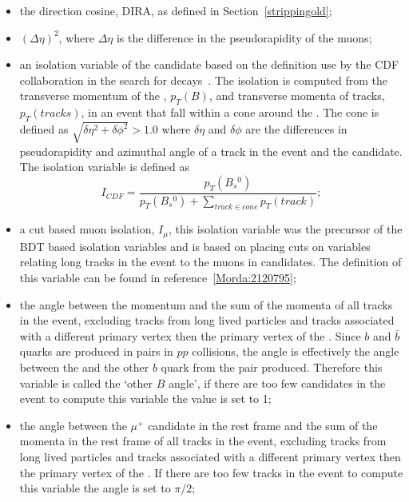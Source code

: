 \begin{itemize}
\item the direction cosine, DIRA, as defined in Section~\ref{strippingold};
\item $(\Delta \eta)^{2}$, where $\Delta \eta$ is the difference in the pseudorapidity of the muons;
\item an isolation variable of the \bs candidate based on the definition use by the CDF collaboration in the search for \bmumu decays~\cite{Abulencia:2005pw}. The isolation is computed from the transverse momentum of the \bs, $p_{T}(B)$, and transverse momenta of tracks, $p_{T}(tracks)$, in an event that fall within a cone around the \bs. The cone is defined as $\sqrt{\delta \eta^{2} + \delta \phi^{2}} > 1.0$ where $\delta \eta$ and $\delta \phi$ are the differences in pseudorapidity and azimuthal angle of a track in the event and the \bs candidate. The isolation variable is defined as 
\begin{equation}
I_{CDF} = \frac{p_{T}(B_{s}{^0})}{p_{T}(B_{s}{^0}) + \displaystyle\sum_{track \in cone}p_{T}(track) };
\end{equation}
\item a cut based muon isolation, $I_{\mu}$, this isolation variable was the precursor of the BDT based isolation variables and is based on placing cuts on variables relating long tracks in the event to the muons in \bsmumu candidates. The definition of this variable can be found in reference~\ref{Morda:2120795};
\item the angle between the \bs momentum and the sum of the momenta of all tracks in the event, excluding tracks from long lived particles and tracks associated with a different primary vertex then the primary vertex of the \bs. Since $b$ and $\bar{b}$ quarks are produced in pairs in $pp$ collisions, the angle is effectively the angle between the \bs and the other $b$ quark from the pair produced. Therefore this variable is called the `other $B$ angle', if there are too few candidates in the event to compute this variable the value is set to 1; %
\item the angle between the $\mu^+$ candidate in the \bs rest frame and the sum of the momenta in the \bs rest frame of all tracks in the event, excluding tracks from long lived particles and tracks associated with a different primary vertex then the primary vertex of the \bs. If there are too few tracks in the event to compute this variable the angle is set to $\pi/2$;%

\end{itemize}
